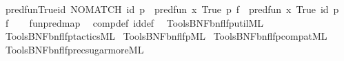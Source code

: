 \begin{isabellebody}
\isanewline
{}\isamarkupfalse%
\ pred{\isacharunderscore}{\kern0pt}fun{\isacharunderscore}{\kern0pt}True{\isacharunderscore}{\kern0pt}id{\isacharcolon}{\kern0pt}\ {\isachardoublequoteopen}NO{\isacharunderscore}{\kern0pt}MATCH\ id\ p\ {\isasymLongrightarrow}\ pred{\isacharunderscore}{\kern0pt}fun\ {\isacharparenleft}{\kern0pt}{\isasymlambda}x{\isachardot}{\kern0pt}\ True{\isacharparenright}{\kern0pt}\ p\ f\ {\isacharequal}{\kern0pt}\ pred{\isacharunderscore}{\kern0pt}fun\ {\isacharparenleft}{\kern0pt}{\isasymlambda}x{\isachardot}{\kern0pt}\ True{\isacharparenright}{\kern0pt}\ id\ {\isacharparenleft}{\kern0pt}p\ {\isasymcirc}\ f{\isacharparenright}{\kern0pt}{\isachardoublequoteclose}\isanewline
%
\isadelimproof
\ \ %
\endisadelimproof
%
\isatagproof
{}\isamarkupfalse%
\ fun{\isachardot}{\kern0pt}pred{\isacharunderscore}{\kern0pt}map\ \isamarkupfalse%
\ comp{\isacharunderscore}{\kern0pt}def\ id{\isacharunderscore}{\kern0pt}def\ \isacommand{{\isachardot}{\kern0pt}{\isachardot}{\kern0pt}}\isamarkupfalse%
%
\endisatagproof
{\isafoldproof}%
%
\isadelimproof
\isanewline
%
\endisadelimproof
%
\isadelimML
\isanewline
%
\endisadelimML
%
\isatagML
{}\isamarkupfalse%
\ {\isacartoucheopen}Tools{\isacharslash}{\kern0pt}BNF{\isacharslash}{\kern0pt}bnf{\isacharunderscore}{\kern0pt}lfp{\isacharunderscore}{\kern0pt}util{\isachardot}{\kern0pt}ML{\isacartoucheclose}\isanewline
{}\isamarkupfalse%
\ {\isacartoucheopen}Tools{\isacharslash}{\kern0pt}BNF{\isacharslash}{\kern0pt}bnf{\isacharunderscore}{\kern0pt}lfp{\isacharunderscore}{\kern0pt}tactics{\isachardot}{\kern0pt}ML{\isacartoucheclose}\isanewline
{}\isamarkupfalse%
\ {\isacartoucheopen}Tools{\isacharslash}{\kern0pt}BNF{\isacharslash}{\kern0pt}bnf{\isacharunderscore}{\kern0pt}lfp{\isachardot}{\kern0pt}ML{\isacartoucheclose}\isanewline
{}\isamarkupfalse%
\ {\isacartoucheopen}Tools{\isacharslash}{\kern0pt}BNF{\isacharslash}{\kern0pt}bnf{\isacharunderscore}{\kern0pt}lfp{\isacharunderscore}{\kern0pt}compat{\isachardot}{\kern0pt}ML{\isacartoucheclose}\isanewline
{}\isamarkupfalse%
\ {\isacartoucheopen}Tools{\isacharslash}{\kern0pt}BNF{\isacharslash}{\kern0pt}bnf{\isacharunderscore}{\kern0pt}lfp{\isacharunderscore}{\kern0pt}rec{\isacharunderscore}{\kern0pt}sugar{\isacharunderscore}{\kern0pt}more{\isachardot}{\kern0pt}ML{\isacartoucheclose}\isanewline

\end{isabellebody}
